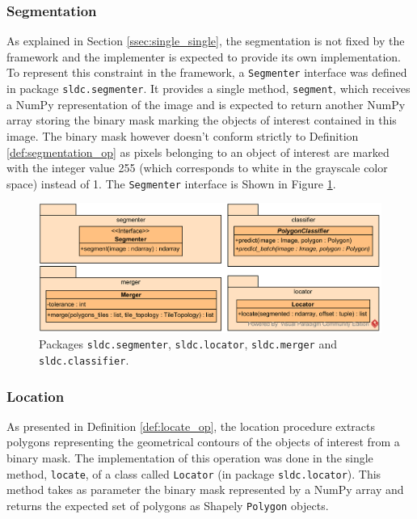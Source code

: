 \subsubsection{Segmentation}
As explained in Section \ref{ssec:single_single}, the segmentation is not fixed by the framework and the implementer is expected to provide its own implementation. To represent this constraint in the framework, a \texttt{Segmenter} interface was defined in package \texttt{sldc.segmenter}. It provides a single method, \texttt{segment}, which receives a NumPy representation of the image and is expected to return another NumPy array storing the binary mask marking the objects of interest contained in this image. The binary mask however doesn't conform strictly to Definition \ref{def:segmentation_op} as pixels belonging to an object of interest are marked with the integer value 255 (which corresponds to white in the grayscale color space) instead of 1. The \texttt{Segmenter} interface is Shown in Figure \ref{fig:uml_pack_seg_merg_loc_classif}.

\begin{figure}
	\center 
	\includegraphics[scale=0.95]{image/uml_seg_merg_loc_classif.png}
	\caption{Packages \texttt{sldc.segmenter}, \texttt{sldc.locator}, \texttt{sldc.merger} and \texttt{sldc.classifier}.}
	\label{fig:uml_pack_seg_merg_loc_classif}
\end{figure}

\subsubsection{Location}
As presented in Definition \ref{def:locate_op}, the location procedure extracts polygons representing the geometrical contours of the objects of interest from a binary mask. The implementation of this operation was done in the single method, \texttt{locate}, of a class called \texttt{Locator} (in package \texttt{sldc.locator}). This method takes as parameter the binary mask represented by a NumPy array and returns the expected set of polygons as Shapely \texttt{Polygon} objects.
 

